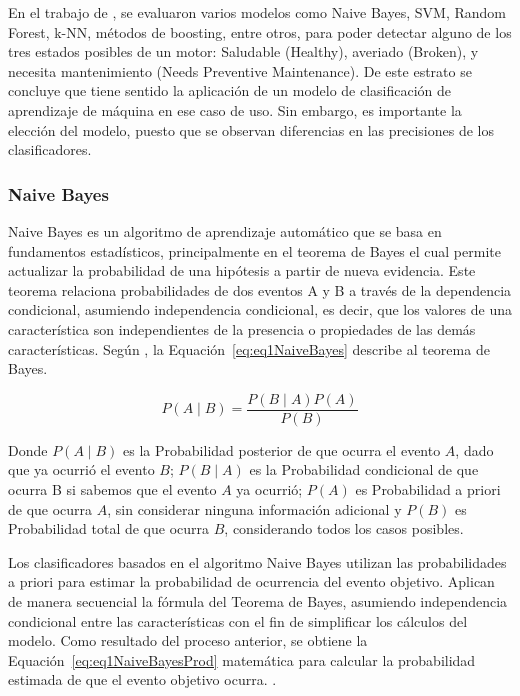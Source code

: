 \documentclass[11pt,a4paper,spanish]{book}
\numberwithin{equation}{chapter}
\numberwithin{figure}{chapter}
\begin{document}
En el trabajo de \cite{baradaran2025predictivemaintenanceelectricmotors}, se  evaluaron varios modelos como Naive Bayes, SVM, Random Forest, k-NN, métodos de boosting, entre otros, para poder detectar alguno de los tres estados posibles de un motor: Saludable (Healthy), averiado (Broken), y necesita mantenimiento (Needs Preventive Maintenance). De este estrato se concluye que tiene sentido la aplicación de un modelo de clasificación de aprendizaje de máquina en ese caso de uso. Sin embargo, es importante la elección del modelo, puesto que se observan diferencias en las precisiones de los clasificadores.   


\subsubsection{Naive Bayes}

Naive Bayes es un algoritmo de aprendizaje automático que se basa en fundamentos estadísticos, principalmente en el teorema de Bayes el cual permite actualizar la probabilidad de una hipótesis a partir de nueva evidencia. Este teorema relaciona probabilidades de dos eventos A y B a través de la dependencia condicional, asumiendo independencia condicional, es decir, que los valores de una característica son independientes de la presencia o propiedades de las demás características. Según \cite{han2012datamining}, la Equación~\ref{eq:eq1NaiveBayes} describe al teorema de Bayes.


\begin{equation}\label{eq:eq1NaiveBayes}
P(A \mid B) = \frac{P(B \mid A) P(A)}{P(B)}
\end{equation}


Donde $P(A \mid B)$ es la Probabilidad posterior de que ocurra el evento $A$, dado que ya ocurrió el evento $B$; $P(B \mid A)$ es la Probabilidad condicional de que ocurra B si sabemos que el evento $A$ ya ocurrió; $P(A)$ es Probabilidad a priori de que ocurra $A$, sin considerar ninguna información adicional y $P(B)$ es Probabilidad total de que ocurra $B$, considerando todos los casos posibles.


Los clasificadores basados en el algoritmo Naive Bayes utilizan las probabilidades a priori para estimar la probabilidad de ocurrencia del evento objetivo. Aplican de manera secuencial la fórmula del Teorema de Bayes, asumiendo independencia condicional entre las características con el fin de simplificar los cálculos del modelo. Como resultado del proceso anterior, se obtiene la Equación~\ref{eq:eq1NaiveBayesProd} matemática para calcular la probabilidad estimada de que el evento objetivo ocurra. \cite{salman2024rf}. 
\end{document}
